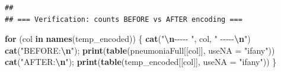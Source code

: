 \documentclass[
]{article}
\newenvironment{Shaded}{\begin{snugshade}}{\end{snugshade}}
\newcommand{\AttributeTok}[1]{\textcolor[rgb]{0.13,0.29,0.53}{#1}}
\newcommand{\ControlFlowTok}[1]{\textcolor[rgb]{0.13,0.29,0.53}{\textbf{#1}}}
\newcommand{\FunctionTok}[1]{\textcolor[rgb]{0.13,0.29,0.53}{\textbf{#1}}}
\newcommand{\NormalTok}[1]{#1}
\newcommand{\SpecialCharTok}[1]{\textcolor[rgb]{0.81,0.36,0.00}{\textbf{#1}}}
\newcommand{\StringTok}[1]{\textcolor[rgb]{0.31,0.60,0.02}{#1}}
\begin{document}
\begin{verbatim}
## 
## === Verification: counts BEFORE vs AFTER encoding ===
\end{verbatim}

\begin{Shaded}
\begin{Highlighting}[]
\ControlFlowTok{for}\NormalTok{ (col }\ControlFlowTok{in} \FunctionTok{names}\NormalTok{(temp\_encoded)) \{}
    \FunctionTok{cat}\NormalTok{(}\StringTok{"}\SpecialCharTok{\textbackslash{}n}\StringTok{{-}{-}{-}{-}{-} "}\NormalTok{, col, }\StringTok{" {-}{-}{-}{-}{-}}\SpecialCharTok{\textbackslash{}n}\StringTok{"}\NormalTok{)}
    \FunctionTok{cat}\NormalTok{(}\StringTok{"BEFORE:}\SpecialCharTok{\textbackslash{}n}\StringTok{"}\NormalTok{); }\FunctionTok{print}\NormalTok{(}\FunctionTok{table}\NormalTok{(pneumoniaFull[[col]], }\AttributeTok{useNA =} \StringTok{"ifany"}\NormalTok{))}
    \FunctionTok{cat}\NormalTok{(}\StringTok{"AFTER:}\SpecialCharTok{\textbackslash{}n}\StringTok{"}\NormalTok{);  }\FunctionTok{print}\NormalTok{(}\FunctionTok{table}\NormalTok{(temp\_encoded[[col]], }\AttributeTok{useNA =} \StringTok{"ifany"}\NormalTok{))}
\NormalTok{\}}
\end{Highlighting}
\end{Shaded}
\end{document}
